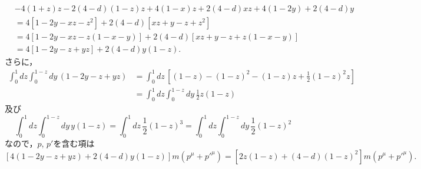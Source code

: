 \begin{align*}
  &  -4(1+z)z - 2(4-d)(1-z)z + 4(1-x)z + 2 (4-d) xz + 4(1-2y) + 2(4-d)y  \\
  &= 4 [ 1 - 2y - xz - z^2 ] + 2 (4-d) [ xz + y -z + z^2 ] \\
  &= 4 [ 1 - 2y - xz - z(1-x-y) ] + 2 (4-d) [ xz + y -z + z(1-x-y) ] \\
  &= 4 [ 1 - 2y - z + yz ] + 2 (4-d) y (1-z) .
\end{align*}
さらに，
\begin{align*}
  \int_0^1 dz \int_0^{1-z} dy \, (1 - 2y - z + yz) &= \int_0^1 dz \, \left[ (1-z) - (1-z)^2 - (1-z)z + \frac{1}{2} (1-z)^2 z \right] \\
  &= \int_0^1 dz \int_0^{1-z} dy \, \frac{1}{2} z(1-z)
\end{align*}
及び
\[
\int_0^1 dz \int_0^{1-z} dy \, y (1-z) = \int_0^1 dz \, \frac{1}{2} (1-z)^3 = \int_0^1 dz \int_0^{1-z} dy \, \frac{1}{2} (1-z)^2
\]
なので，$p$, $p'$を含む項は
\[ \left[ 4 ( 1 - 2y - z +yz ) + 2 (4-d) y (1-z) \right] m(p^\mu + p'^\mu) = \left[ 2 z(1-z) + (4-d) (1-z)^2 \right] m(p^\mu + p'^\mu) . \]

